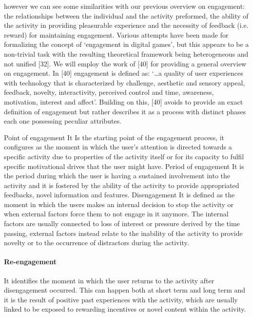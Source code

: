 however we can see some similarities with our previous overview on engagement: the relationships between the individual and the activity preformed, the ability of the activity in providing pleasurable experience and the necessity of feedback (i.e. reward) for maintaining engagement.
Various attempts have been made for formalizing the concept of ‘engagement in digital games’, but this appears to be a non-trivial task with the resulting theoretical framework being heterogeneous and not unified [32]. We will employ the work of [40] for providing a general overview on engagement. In [40] engagement is defined as:
‘…a quality of user experiences with technology that is characterized by challenge, aesthetic and sensory appeal, feedback, novelty, interactivity, perceived control and time, awareness, motivation, interest and affect’.
Building on this, [40] avoids to provide an exact definition of engagement but rather describes it as a process with distinct phases each one possessing peculiar attributes.

Point of engagement
It Is the starting point of the engagement process, it configures as the moment in which the user’s attention is directed towards a specific activity due to properties of the activity itself or for its capacity to fulfil specific motivational drives that the user might have.
Period of engagement
It is the period during which the user is having a sustained involvement into the activity and it is fostered by the ability of the activity to provide appropriated feedbacks, novel information and features.
Disengagement
It is defined as the moment in which the users makes an internal decision to stop the activity or when external factors force them to not engage in it anymore. The internal factors are usually connected to loss of interest or pressure derived by the time passing, external factors instead relate to the inability of the activity to provide novelty or to the occurrence of distractors during the activity.
\paragraph*{Re-engagement} It identifies the moment in which the user returns to the activity after disengagement occurred. This can happen both at short term and long term and it is the result of positive past experiences with the activity, which are usually linked to be exposed to rewarding incentives or novel content within the activity.

